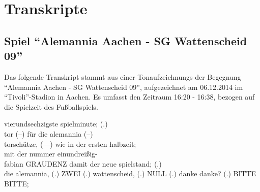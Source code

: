 \section{Transkripte}
\subsection{Spiel "`Alemannia Aachen - SG Wattenscheid 09"'}
Das folgende Transkript stammt aus einer Tonaufzeichnungs der Begegnung "`Alemannia Aachen - SG Wattenscheid 09"', aufgezeichnet am 06.12.2014 im "`Tivoli"'-Stadion in Aachen. Es umfasst den Zeitraum 16:20 - 16:38, bezogen auf die Spielzeit des Fußballspiels.

\begin{dialogue}
	 vierundsechzigste spielminute; (.) \\
	tor (--) für die alemannia (--) \\
	torschütze, (---) wie in der ersten halbzeit; \\
	mit der nummer einundreißig- \\
	fabian
	 GRAUDENZ
	 damit der neue spielstand; (.) \\
	die alemannia, (.)
	 ZWEI (.)
	 wattenscheid, (.)
	 NULL (.)
	 danke danke? (.)
	 BITTE BITTE;
\end{dialogue}
